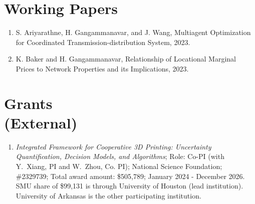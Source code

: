 \documentclass[hyperref, margin]{myResume}
\newif\ifpublic
\begin{document}
\begin{resume}
 \section{Working Papers}
\begin{enumerate}[label=W\arabic*., leftmargin=*]
	\item S. Ariyarathne\footnotemark[1], H. Gangammanavar, and J. Wang, Multiagent Optimization for Coordinated Transmission-distribution System, 2023.
	\item K. Baker and H. Gangammanavar, Relationship of Locational Marginal Prices to Network Properties and its Implications, 2023.	
\end{enumerate}

\section{Grants\\(External)}
\begin{enumerate}[label=G\arabic*., leftmargin=*]

	\item \emph{Integrated Framework for Cooperative 3D Printing: Uncertainty Quantification, Decision Models, and Algorithms}; Role: Co-PI (with Y.\ Xiang, PI and W.\ Zhou, Co. PI); National Science Foundation; \#2329739; Total award amount: \$505,789; January 2024 - December 2026.\ifpublic \else \\ SMU share of \$99,131 is through University of Houston (lead institution). University of Arkansas is the other participating institution. \fi


\end{enumerate}
\end{resume}
\end{document}
